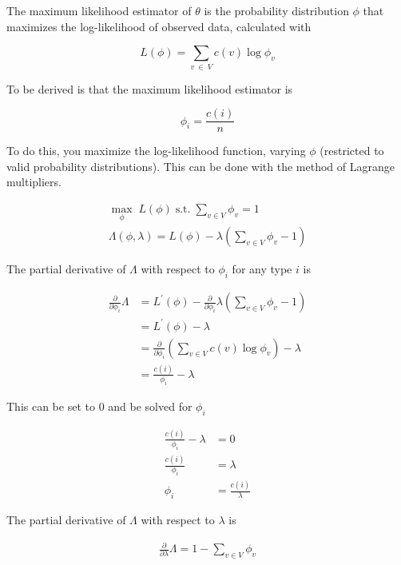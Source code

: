 \documentclass[11pt]{article}
\begin{document}
The maximum likelihood estimator of $\theta$ is the probability distribution $\phi$ that maximizes the log-likelihood of observed data, calculated with

$$ L \left( \phi \right) = \sum \limits_{v \: \in \: V} c \left( v \right) \log{\phi_v} $$

To be derived is that the maximum likelihood estimator is

$$\phi_i = \frac{c \left( i \right)}{n}$$

To do this, you maximize the log-likelihood function, varying $\phi$ (restricted to valid probability distributions). This can be done with the method of Lagrange multipliers.

\begin{align*}
\max \limits_{\phi} \; L\left( \phi \right) \; \text{s.t.} \; \sum \limits_{v \in V} \phi_{v} = 1 \\
%
\Lambda \left( \phi, \lambda \right) = L\left( \phi \right) - \lambda \left( \sum \limits_{v \in V} \phi_{v} - 1 \right)
\end{align*}

The partial derivative of $\Lambda$ with respect to $\phi_i$ for any type $i$ is

\begin{align*}
%
\frac{\partial}{\partial \phi_i} \Lambda &= L^\prime \left( \phi \right) - \frac{\partial}{\partial \phi_i} \lambda \left( \sum \limits_{v \in V} \phi_{v} - 1 \right) \\
%
&= L^\prime \left( \phi \right) - \lambda \\
%
&= \frac{\partial}{\partial \phi_i} \left( \sum \limits_{v \in V} c \! \left( v \right) \log{\phi_v} \right) - \lambda \\
%
&= \frac{c \left( i \right)}{\phi_i} - \lambda
\end{align*}

This can be set to $0$ and be solved for $\phi_i$

\begin{align*}
\frac{c \left( i \right)}{\phi_i} - \lambda &= 0 \\
%
\frac{c \left( i \right)}{\phi_i} &= \lambda \\
%
\phi_{i} &= \frac{c \left( i \right)}{\lambda}
\end{align*}

The partial derivative of $\Lambda$ with respect to $\lambda$ is

\begin{align*}
\frac{\partial}{\partial \lambda} \Lambda = 1 - \sum \limits_{v \in V} \phi_{v}
\end{align*}
\end{document}
